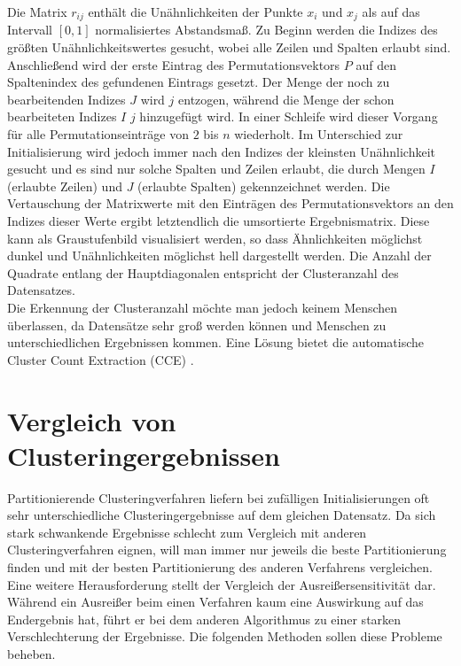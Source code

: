 \documentclass[11pt,ceqn]{book}
\begin{document}
Die Matrix $r_{ij}$ enthält die Unähnlichkeiten der Punkte $x_i$ und $x_j$ als auf das Intervall $\left[0,1\right]$ normalisiertes Abstandsmaß. Zu Beginn werden die Indizes des größten Unähnlichkeitswertes gesucht, wobei alle Zeilen und Spalten erlaubt sind. Anschließend wird der erste Eintrag des Permutationsvektors $P$ auf den Spaltenindex des gefundenen Eintrags gesetzt. Der Menge der noch zu bearbeitenden Indizes $J$ wird $j$ entzogen, während die Menge der schon bearbeiteten Indizes $I$ $j$ hinzugefügt wird. In einer Schleife wird dieser Vorgang für alle Permutationseinträge von $2$ bis $n$ wiederholt. Im Unterschied zur Initialisierung wird jedoch immer nach den Indizes der kleinsten Unähnlichkeit gesucht und es sind nur solche Spalten und Zeilen erlaubt, die durch Mengen $I$ (erlaubte Zeilen) und $J$ (erlaubte Spalten) gekennzeichnet werden. Die Vertauschung der Matrixwerte mit den Einträgen des Permutationsvektors an den Indizes dieser Werte ergibt letztendlich die umsortierte Ergebnismatrix. Diese kann als Graustufenbild visualisiert werden, so dass Ähnlichkeiten möglichst dunkel und Unähnlichkeiten möglichst hell dargestellt werden. Die Anzahl der Quadrate entlang der Hauptdiagonalen entspricht der Clusteranzahl des Datensatzes.
\\
Die Erkennung der Clusteranzahl möchte man jedoch keinem Menschen überlassen, da Datensätze sehr groß werden können und Menschen zu unterschiedlichen Ergebnissen kommen. Eine Lösung bietet die automatische Cluster Count Extraction (CCE) \cite{cce}.


\section{Vergleich von Clusteringergebnissen}
Partitionierende Clusteringverfahren liefern bei zufälligen Initialisierungen oft sehr unterschiedliche Clusteringergebnisse auf dem gleichen Datensatz. Da sich stark schwankende Ergebnisse schlecht zum Vergleich mit anderen Clusteringverfahren eignen, will man immer nur jeweils die beste Partitionierung finden und mit der besten Partitionierung des anderen Verfahrens vergleichen. Eine weitere Herausforderung stellt der Vergleich der Ausreißersensitivität dar. Während ein Ausreißer beim einen Verfahren kaum eine Auswirkung auf das Endergebnis hat, führt er bei dem anderen Algorithmus zu einer starken Verschlechterung der Ergebnisse. Die folgenden Methoden sollen diese Probleme beheben. 
\end{document}
